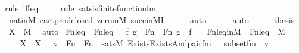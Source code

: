 \begin{isabellebody}
{\isacharparenleft}{\kern0pt}rule\ iff{\isacharunderscore}{\kern0pt}eq{\isacharparenright}{\kern0pt}\isanewline
\ \ \ \ \isamarkupfalse%
{\isacharparenleft}{\kern0pt}rule\ sats{\isacharunderscore}{\kern0pt}is{\isacharunderscore}{\kern0pt}finite{\isacharunderscore}{\kern0pt}function{\isacharunderscore}{\kern0pt}fm{\isacharparenright}{\kern0pt}\isanewline
\ \ \ \ \isamarkupfalse%
\ nat{\isacharunderscore}{\kern0pt}in{\isacharunderscore}{\kern0pt}M\ cartprod{\isacharunderscore}{\kern0pt}closed\ zero{\isacharunderscore}{\kern0pt}in{\isacharunderscore}{\kern0pt}M\ succ{\isacharunderscore}{\kern0pt}in{\isacharunderscore}{\kern0pt}MI\isanewline
\ \ \ \ \isamarkupfalse%
\ auto{\isacharbrackleft}{\kern0pt}{}{\isacharbrackright}{\kern0pt}\isanewline
\ \ \ \ \isamarkupfalse%
\ auto\isanewline
\ \ \isamarkupfalse%
\ \isamarkupfalse%
\ {\isacharquery}{\kern0pt}thesis\ \isamarkupfalse%
\ {\isacartoucheopen}X\ {\isasymin}\ M{\isacartoucheclose}\ \isamarkupfalse%
\ auto\isanewline
{}\isamarkupfalse%
%
\endisatagproof
{\isafoldproof}%
%
\isadelimproof
\isanewline
%
\endisadelimproof
\isanewline
{}\isamarkupfalse%
\ Fn{\isacharunderscore}{\kern0pt}leq\ \ {\isachardoublequoteopen}Fn{\isacharunderscore}{\kern0pt}leq\ {\isasymequiv}\ {\isacharbraceleft}{\kern0pt}\ {\isacharless}{\kern0pt}f{\isacharcomma}{\kern0pt}\ g{\isachargreater}{\kern0pt}\ {\isasymin}\ Fn\ {\isasymtimes}\ Fn{\isachardot}{\kern0pt}\ g\ {\isasymsubseteq}\ f\ {\isacharbraceright}{\kern0pt}{\isachardoublequoteclose}\ \isanewline
\isanewline
{}\isamarkupfalse%
\ Fn{\isacharunderscore}{\kern0pt}leq{\isacharunderscore}{\kern0pt}in{\isacharunderscore}{\kern0pt}M\ {\isacharcolon}{\kern0pt}\ {\isachardoublequoteopen}Fn{\isacharunderscore}{\kern0pt}leq\ {\isasymin}\ M{\isachardoublequoteclose}\ \isanewline
%
\isadelimproof
%
\endisadelimproof
%
\isatagproof
{}\isamarkupfalse%
\ {\isacharminus}{\kern0pt}\ \isanewline
\ \ \isamarkupfalse%
\ X\ \ {\isachardoublequoteopen}X\ {\isasymequiv}\ {\isacharbraceleft}{\kern0pt}\ v\ {\isasymin}\ Fn\ {\isasymtimes}\ Fn\ {\isachardot}{\kern0pt}\ sats{\isacharparenleft}{\kern0pt}M{\isacharcomma}{\kern0pt}\ Exists{\isacharparenleft}{\kern0pt}Exists{\isacharparenleft}{\kern0pt}And{\isacharparenleft}{\kern0pt}pair{\isacharunderscore}{\kern0pt}fm{\isacharparenleft}{\kern0pt}{}{\isacharcomma}{\kern0pt}\ {}{\isacharcomma}{\kern0pt}\ {}{\isacharparenright}{\kern0pt}{\isacharcomma}{\kern0pt}\ subset{\isacharunderscore}{\kern0pt}fm{\isacharparenleft}{\kern0pt}{}{\isacharcomma}{\kern0pt}\ {}{\isacharparenright}{\kern0pt}{\isacharparenright}{\kern0pt}{\isacharparenright}{\kern0pt}{\isacharparenright}{\kern0pt}{\isacharcomma}{\kern0pt}\ {\isacharbrackleft}{\kern0pt}v{\isacharbrackright}{\kern0pt}\ {\isacharat}{\kern0pt}\ {\isacharbrackleft}{\kern0pt}{\isacharbrackright}{\kern0pt}{\isacharparenright}{\kern0pt}\ {\isacharbraceright}{\kern0pt}{\isachardoublequoteclose}\ \isanewline

\end{isabellebody}

